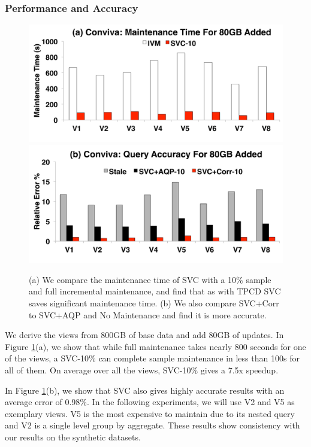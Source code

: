 \subsubsection{Performance and Accuracy}
\begin{figure}[t] \vspace{-2em}
\centering
 \includegraphics[scale=0.10]{exp/con_3.pdf}
 \includegraphics[scale=0.10]{exp/con_4.pdf} \vspace{-1.0em}
 \caption{(a) We compare the maintenance time of SVC with a 10\% sample and full incremental maintenance, and find that as with TPCD SVC saves significant maintenance time. (b) We also compare SVC+Corr to SVC+AQP and No Maintenance and find it is more accurate. \label{conv-1}}
\end{figure}
We derive the views from 800GB of base data and add 80GB of updates.
In Figure \ref{conv-1}(a), we show that while full maintenance takes nearly 800 seconds for one of the views, a SVC-10\% can complete sample maintenance in less than 100s for all of them.
On average over all the views, SVC-10\% gives a 7.5x speedup.

In Figure \ref{conv-1}(b), we show that SVC also gives highly accurate results with an average error of 0.98\%.
In the following experiments, we will use V2 and V5 as exemplary views.
V5 is the most expensive to maintain due to its nested query and V2 is a single level group by aggregate.
These results show consistency with our results on the synthetic datasets.

